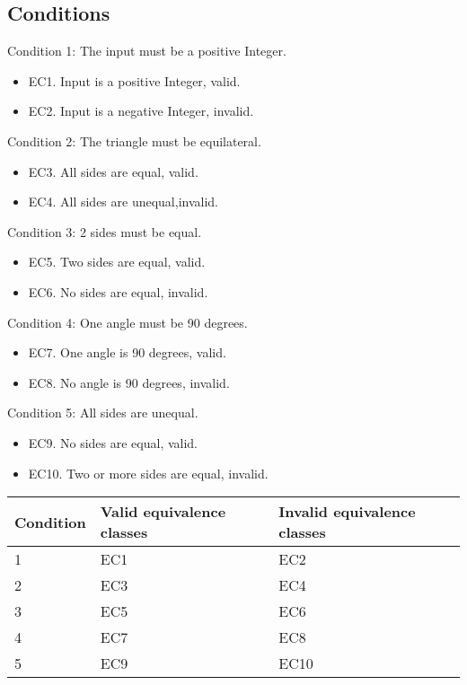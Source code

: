 \subsection{Conditions}
Condition 1: The input must be a positive Integer.
\begin{itemize}
	\item EC1. Input is a positive Integer, valid.
	\item EC2. Input is a negative Integer, invalid.
\end{itemize}

Condition 2: The triangle must be equilateral.
\begin{itemize}
	\item EC3. All sides are equal, valid. 
	\item EC4. All sides are unequal,invalid. 
\end{itemize}

Condition 3: 2 sides must be equal.  
\begin{itemize}
	\item EC5. Two sides are equal, valid. 
	\item EC6. No sides are equal, invalid. 
\end{itemize}

Condition 4: One angle must be 90 degrees. 
\begin{itemize}
	\item EC7. One angle is 90 degrees, valid. 
	\item EC8. No angle is 90 degrees, invalid. 
\end{itemize}

Condition 5: All sides are unequal. 
\begin{itemize}
	\item EC9. No sides are equal, valid. 
	\item EC10. Two or more sides are equal, invalid. 
\end{itemize}


\begin{table}
    \begin{tabular}{|l|l|l|}
        \hline
        Condition  & Valid equivalence classes & Invalid equivalence classes \\ \hline
        1          & EC1                       & EC2                         \\ 
        2          & EC3                       & EC4                         \\ 
        3          & EC5                       & EC6                         \\ 
        4          & EC7                       & EC8                         \\ 
        5          & EC9                       & EC10                        \\
        \hline
    \end{tabular}
\end{table}


